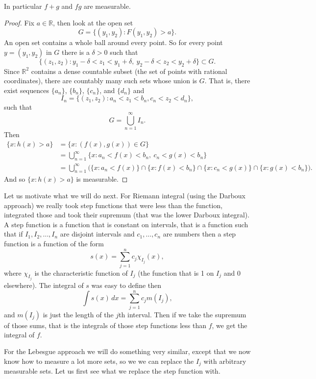 \documentclass[12pt]{book}
\newcommand{\R}{{\mathbb{R}}}
\theoremstyle{plain}
\theoremstyle{remark}
\theoremstyle{definition}
\theoremstyle{exercise}
\theoremstyle{example}
\begin{document}
In particular $f+g$ and $fg$ are measurable.

\medskip

\begin{proof}
Fix $a \in \R$, then look at the open set
$$
G = \{ (y_1,y_2) : F(y_1,y_2) > a \} .
$$
An open set contains a whole ball around every 
point.  So for every point $y=(y_1,y_2)$ in $G$
there is a $\delta > 0$ such that
$$
\{ (z_1,z_2) : y_1 - \delta < z_1 < y_1 +\delta, ~
y_2 - \delta < z_2 < y_2 +\delta \} \subset G .
$$
Since $\R^2$ contains a dense countable subset (the set of points with
rational coordinates), there are countably
many such sets whose union is $G$.  That is, there exist
sequences $\{ a_n\}$, $\{b_n\}$, $\{c_n\}$, and $\{d_n\}$ and
$$
I_n = \{ (z_1,z_2) : a_n < z_1 < b_n, 
c_n < z_2 < d_n \} ,
$$
such that
$$
G = \bigcup_{n=1}^\infty I_n .
$$
Then
\begin{equation*}
\begin{split}
\{ x : h(x) > a \} & =
\{ x : (f(x),g(x)) \in G \}
\\
& =
\bigcup_{n=1}^\infty
\{ x : a_n < f(x) < b_n, ~c_n < g(x) < b_n \}
\\
& =
\bigcup_{n=1}^\infty
\bigl(
\{ x : a_n < f(x) \}
\cap
\{ x : f(x) < b_n \}
\cap
\{ x : c_n < g(x) \}
\cap
\{ x : g(x) < b_n \} \bigr).
\end{split}
\end{equation*}
And so $\{ x : h(x) > a \}$ is measurable.
\end{proof}

\medskip

Let us motivate what we will do next.  For Riemann integral (using the
Darboux approach) we really took
step functions that were less than the function, integrated those and took
their supremum (that was the lower Darboux integral).  A step function is
a function that is constant on intervals, that is a function such that if
$I_1, I_2, \ldots, I_n$ are disjoint intervals and $c_1, \ldots, c_n$
are numbers then a step function is a function of the form
$$
s(x) = \sum_{j=1}^n c_j \chi_{I_j} (x) ,
$$
where $\chi_{I_j}$ is the characteristic function of $I_j$ (the function
that is 1 on $I_j$ and 0 elsewhere).  The integral of $s$ was easy to
define then
$$
\int s(x) \, dx = \sum_{j=1}^n c_j m(I_j) ,
$$
and $m(I_j)$ is just the length of the $j$th interval.
Then if we take the supremum of those sums, that is the integrals of those step
functions less than $f$, we get the integral of $f$.

For the Lebesgue approach we will do something very similar, except that
we now know how to measure a lot more sets, so we we can replace the $I_j$
with arbitrary measurable sets.  Let us first see what we replace the step
function with.
\end{document}
